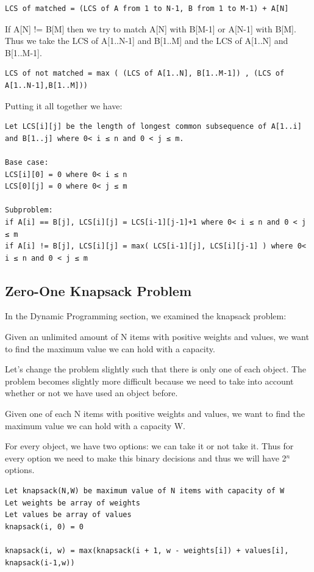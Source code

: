 \documentclass[11pt,oneside]{book}
\begin{document}
\begin{lstlisting}
LCS of matched = (LCS of A from 1 to N-1, B from 1 to M-1) + A[N]
\end{lstlisting}

If A[N] != B[M] then we try to match A[N] with B[M-1] or A[N-1] with B[M]. Thus we take the LCS of A[1..N-1] and B[1..M] and the LCS of A[1..N] and B[1..M-1].

\begin{lstlisting}
LCS of not matched = max ( (LCS of A[1..N], B[1..M-1]) , (LCS of A[1..N-1],B[1..M]))
\end{lstlisting}

Putting it all together we have:

\begin{lstlisting}
Let LCS[i][j] be the length of longest common subsequence of A[1..i] and B[1..j] where 0< i ≤ n and 0 < j ≤ m.

Base case:
LCS[i][0] = 0 where 0< i ≤ n
LCS[0][j] = 0 where 0< j ≤ m

Subproblem:
if A[i] == B[j], LCS[i][j] = LCS[i-1][j-1]+1 where 0< i ≤ n and 0 < j ≤ m
if A[i] != B[j], LCS[i][j] = max( LCS[i-1][j], LCS[i][j-1] ) where 0< i ≤ n and 0 < j ≤ m
\end{lstlisting}

\subsection{Zero-One Knapsack Problem}

In the Dynamic Programming section, we examined the knapsack problem:

Given an unlimited amount of N items with positive weights and values, we want to find the maximum value we can hold with a capacity.

Let's change the problem slightly such that there is only one of each object. The problem becomes slightly more difficult because we need to take into account whether or not we have used an object before.

Given one of each N items with positive weights and values, we want to find the maximum value we can hold with a capacity W.

For every object, we have two options: we can take it or not take it. Thus for every option we need to make this binary decisions and thus we will have 2$^{n}$ options.

\begin{lstlisting}
Let knapsack(N,W) be maximum value of N items with capacity of W
Let weights be array of weights
Let values be array of values
knapsack(i, 0) = 0

knapsack(i, w) = max(knapsack(i + 1, w - weights[i]) + values[i], knapsack(i-1,w))
\end{lstlisting}
\end{document}
